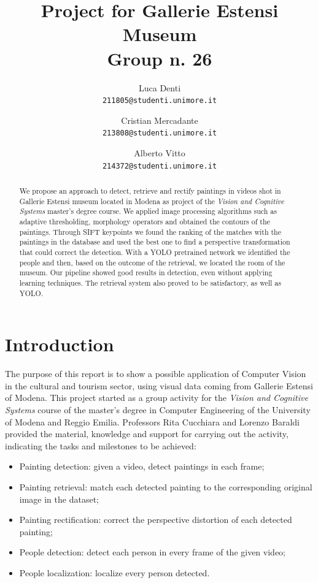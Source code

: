 \documentclass[10pt,twocolumn,letterpaper]{article}
\begin{document}
\title{Project for Gallerie Estensi Museum\\
\large Group n. 26}

\author{
Luca Denti\\
{\tt\small 211805@studenti.unimore.it}
\and
Cristian Mercadante\\
{\tt\small 213808@studenti.unimore.it}
\and
Alberto Vitto\\
{\tt\small 214372@studenti.unimore.it}
}

\maketitle

\begin{abstract}
We propose an approach to detect, retrieve and rectify paintings in videos shot in Gallerie Estensi museum located in Modena as project of the \emph{Vision and Cognitive Systems} master's degree course. We applied image processing algorithms such as adaptive thresholding, morphology operators and obtained the contours of the paintings. Through SIFT keypoints we found the ranking of the matches with the paintings in the database and used the best one to find a perspective transformation that could correct the detection. With a YOLO pretrained network we identified the people and then, based on the outcome of the retrieval, we located the room of the museum. Our pipeline showed good results in detection, even without applying learning techniques. The retrieval system also proved to be satisfactory, as well as YOLO.
\end{abstract}


\section{Introduction}
\label{sec:Introduction}
The purpose of this report is to show a possible application of Computer Vision in the cultural and tourism sector, using visual data coming from Gallerie Estensi of Modena. This project started as a group activity for the \textit{Vision and Cognitive Systems} course of the master's degree in Computer Engineering of the University of Modena and Reggio Emilia. Professors Rita Cucchiara and Lorenzo Baraldi provided the material, knowledge and support for carrying out the activity, indicating the tasks and milestones to be achieved:
\begin{itemize}
    \item Painting detection: given a video, detect paintings in each frame;
    \item Painting retrieval: match each detected painting to the corresponding original image in the dataset;
    \item Painting rectification: correct the perspective distortion of each detected painting;
    \item People detection: detect each person in every frame of the given video;
    \item People localization: localize every person detected.
\end{itemize}
\end{document}
